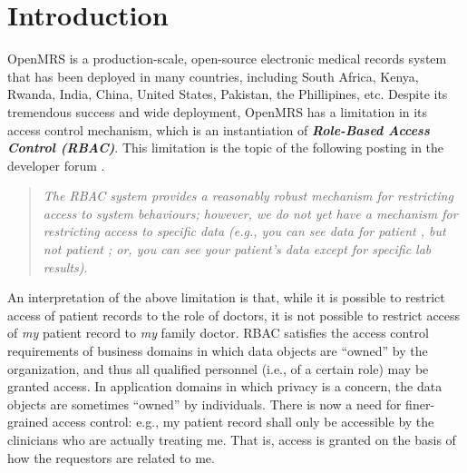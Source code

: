 \documentclass{acm_proc_article-sp}
\newcommand{\Dfn}[1]{\textbf{\emph{#1}}}
\begin{document}



\section{Introduction}

OpenMRS \cite{OpenMRS} is a production-scale, open-source electronic medical records
system that has been deployed in many countries, including South
Africa, Kenya, Rwanda, India, China, United States, Pakistan, the
Phillipines, etc.  Despite its tremendous success and wide deployment,
OpenMRS has a limitation in its access control mechanism, which is an
instantiation of \Dfn{Role-Based Access Control (RBAC)}. This
limitation is the topic of the following posting in the developer
forum \cite{OpenMRSPosting}.
\begin{quote}
  \emph{The RBAC system provides a reasonably robust mechanism for
    restricting access to system behaviours; however, we do not yet
    have a mechanism for restricting access to specific data (e.g.,
    you can see data for patient , but not patient ; or, you can
    see your patient's data except for specific lab results).}
\end{quote}
An interpretation of the above limitation is that, while it is
possible to restrict access of patient records to the role of doctors,
it is not possible to restrict access of \emph{my} patient record to
\emph{my} family doctor.  RBAC satisfies the access control
requirements of business domains in which data objects are ``owned''
by the organization, and thus all qualified personnel (i.e., of a
certain role) may be granted access.  In application domains in which
privacy is a concern, the data objects are sometimes ``owned'' by
individuals. There is now a need for finer-grained access control:
e.g., my patient record shall only be accessible by the clinicians who
are actually treating me.  That is, access is granted on the basis of
how the requestors are related to me.
\end{document}
